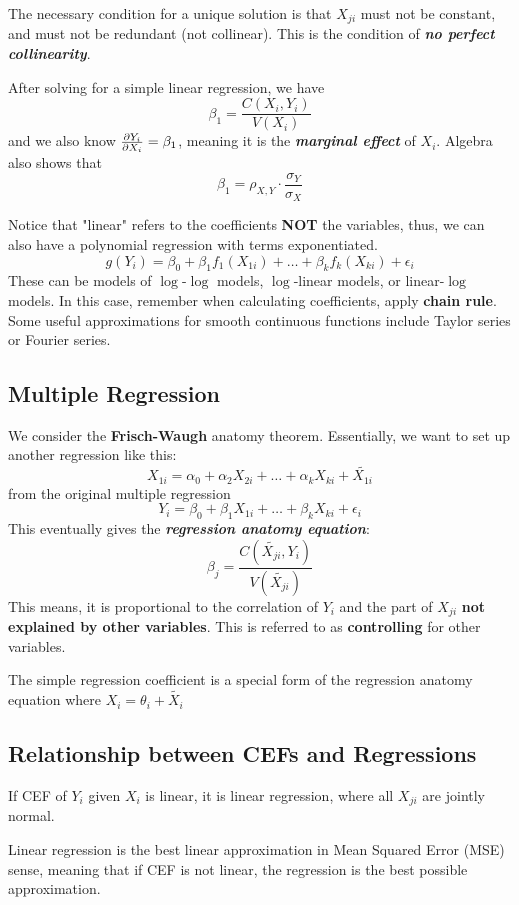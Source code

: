 The necessary condition for a unique solution is that $X_{ji}$ must not be constant, and must not be redundant (not collinear). This is the condition of \textbf{\textit{no perfect collinearity}}.

After solving for a simple linear regression, we have
$$\beta_1 = \frac{C(X_i, Y_i)}{V(X_i)}$$
and we also know $\pdv{Y_i}{X_i} = \beta_1$, meaning it is the \textbf{\textit{marginal effect}} of $X_i$. Algebra also shows that
$$\beta_1 = \rho_{X, Y} \cdot \frac{\sigma_Y}{\sigma_X}$$

Notice that "linear" refers to the coefficients \textbf{NOT} the variables, thus, we can also have a polynomial regression with terms exponentiated.
$$g(Y_i) = \beta_0 + \beta_1 f_1(X_{1i}) + \dots + \beta_k f_k(X_{ki}) + \epsilon_i$$
These can be models of $\log$-$\log$ models, $\log$-linear models, or linear-$\log$ models.
In this case, remember when calculating coefficients, apply \textbf{chain rule}. Some useful approximations for smooth continuous functions include Taylor series or Fourier series.

\subsection{Multiple Regression}
We consider the \textbf{Frisch-Waugh} anatomy theorem. Essentially, we want to set up another regression like this:
$$X_{1i} = \alpha_0 + \alpha_2 X_{2i} + \dots + \alpha_k X_{ki} + \tilde{X_{1i}}$$
from the original multiple regression
$$Y_i = \beta_0 + \beta_1 X_{1i} + \dots + \beta_k X_{ki} + \epsilon_i$$
This eventually gives the \textbf{\textit{regression anatomy equation}}:
$$\beta_j = \frac{C(\tilde{X_{ji}}, Y_i)}{V(\tilde{X_{ji}})}$$
This means, it is proportional to the correlation of $Y_i$ and the part of $X_{ji}$ \textbf{not explained by other variables}. This is referred to as \textbf{controlling} for other variables.

The simple regression coefficient is a special form of the regression anatomy equation where $X_i = \theta_i + \tilde{X_i}$

\subsection{Relationship between CEFs and Regressions}
If CEF of $Y_i$ given $X_i$ is linear, it is linear regression, where all $X_{ji}$ are jointly normal.

Linear regression is the best linear approximation in Mean Squared Error (MSE) sense, meaning that if CEF is not linear, the regression is the best possible approximation.

